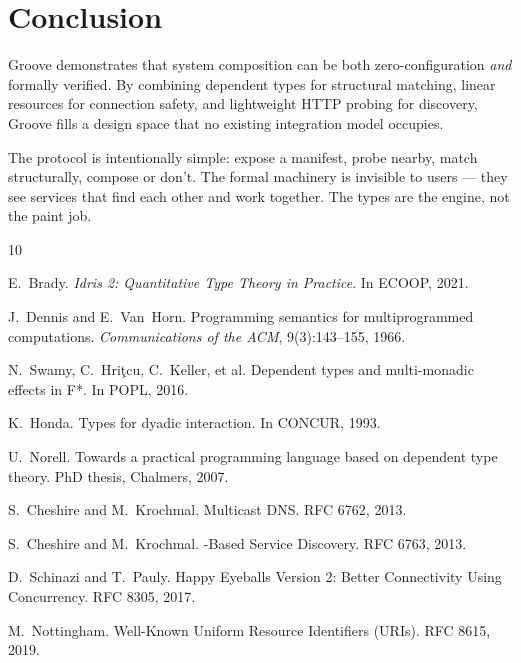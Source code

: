 \documentclass[11pt,a4paper]{article}
\begin{document}
\section{Conclusion}

Groove demonstrates that system composition can be both zero-configuration
\emph{and} formally verified. By combining dependent types for structural
matching, linear resources for connection safety, and lightweight HTTP
probing for discovery, Groove fills a design space that no existing
integration model occupies.

The protocol is intentionally simple: expose a manifest, probe nearby,
match structurally, compose or don't. The formal machinery is invisible
to users --- they see services that find each other and work together.
The types are the engine, not the paint job.


\begin{thebibliography}{10}

E.~Brady.
\newblock \emph{Idris 2: Quantitative Type Theory in Practice}.
\newblock In ECOOP, 2021.

J.~Dennis and E.~Van~Horn.
\newblock Programming semantics for multiprogrammed computations.
\newblock \emph{Communications of the ACM}, 9(3):143--155, 1966.

N.~Swamy, C.~Hri\c{t}cu, C.~Keller, et al.
\newblock Dependent types and multi-monadic effects in {F*}.
\newblock In POPL, 2016.

K.~Honda.
\newblock Types for dyadic interaction.
\newblock In CONCUR, 1993.

U.~Norell.
\newblock Towards a practical programming language based on dependent type
  theory.
\newblock PhD thesis, Chalmers, 2007.

S.~Cheshire and M.~Krochmal.
\newblock Multicast {DNS}.
\newblock RFC 6762, 2013.

S.~Cheshire and M.~Krochmal.
-Based Service Discovery.
\newblock RFC 6763, 2013.

D.~Schinazi and T.~Pauly.
\newblock Happy Eyeballs Version 2: Better Connectivity Using Concurrency.
\newblock RFC 8305, 2017.

M.~Nottingham.
\newblock Well-Known Uniform Resource Identifiers ({URIs}).
\newblock RFC 8615, 2019.

\end{thebibliography}
\end{document}
